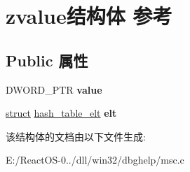 \hypertarget{structzvalue}{}\section{zvalue结构体 参考}
\label{structzvalue}
\subsection*{Public 属性}
\begin{DoxyCompactItemize}
\item 
\mbox{\label{structzvalue_a2cfe3cae7ecfef23db26caff439ee68b}} 
D\+W\+O\+R\+D\+\_\+\+P\+TR {\bfseries value}
\item 
\mbox{\label{structzvalue_af7454b9d6a89d59308476e7c9fa15e35}} 
\hyperlink{interfacestruct}{struct} \hyperlink{structhash__table__elt}{hash\+\_\+table\+\_\+elt} {\bfseries elt}
\end{DoxyCompactItemize}


该结构体的文档由以下文件生成\+:\begin{DoxyCompactItemize}
\item 
E\+:/\+React\+O\+S-\/0../dll/win32/dbghelp/msc.\+c\end{DoxyCompactItemize}
